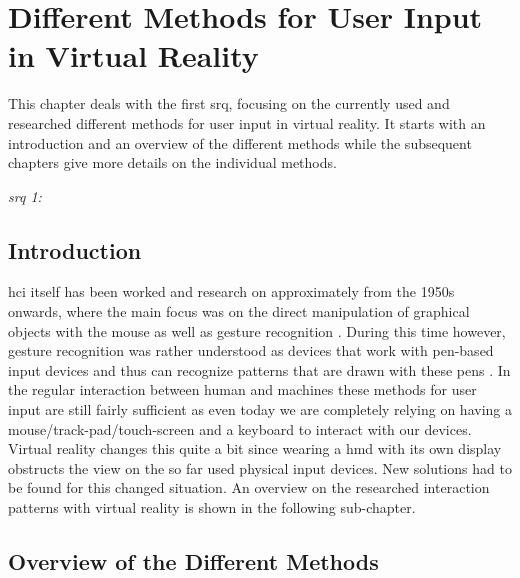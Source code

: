 
\section{Different Methods for User Input in Virtual Reality}

\label{SectionLiteratureReviewSRQ1}

This chapter deals with the first \gls{srq}, focusing on the currently used and researched different methods for user input in virtual reality. It starts with an introduction and an overview of the different methods while the subsequent chapters give more details on the individual methods.
\begin{framed}
	\textit{\gls{srq} 1: \srqonetext}
\end{framed}

\subsection{Introduction}

\gls{hci} itself has been worked and research on approximately from the 1950s onwards, where the main focus was on the direct manipulation of graphical objects with the mouse as well as gesture recognition \citep{Myers1998}. During this time however, gesture recognition was rather understood as devices that work with pen-based input devices and thus can recognize patterns that are drawn with these pens \citep{Myers1998}. In the regular interaction between human and machines these methods for user input are still fairly sufficient as even today we are completely relying on having a mouse/track-pad/touch-screen and a keyboard to interact with our devices. \newline
Virtual reality changes this quite a bit since wearing a \gls{hmd} with its own display obstructs the view on the so far used physical input devices. New solutions had to be found for this changed situation. An overview on the researched interaction patterns with virtual reality is shown in the following sub-chapter.



\subsection{Overview of the Different Methods}

